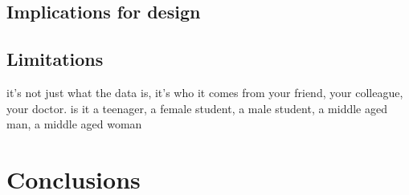 \documentclass{sigchi}
\begin{document}
\subsection{Implications for design}

\subsection{Limitations}

it's not just what the data is, it's who it comes from {your friend, your colleague, your doctor}. is it {a teenager, a female student, a male student, a middle aged man, a middle aged woman}


\section{Conclusions}




\end{document}

